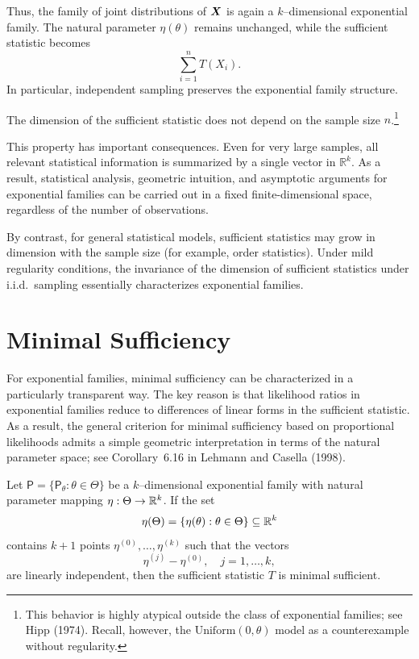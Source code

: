 Thus, the family of joint distributions of \(\boldsymbol{X}\) is again a \(k\)--dimensional exponential family.
The natural parameter \(\eta(\theta)\) remains unchanged, while the sufficient statistic becomes
\[
    \sum\limits_{i=1}^{n} T(X_i).
\]
In particular, independent sampling preserves the exponential family structure.

\begin{note}
The dimension of the sufficient statistic
does not depend on the sample size \(n\).\footnote{This behavior is highly atypical outside the class
of exponential families; see Hipp (1974). Recall, however, the \(\mathrm{Uniform}(0,\theta)\) model
as a counterexample without regularity.}
\end{note}

This property has important consequences. Even for very large samples, all relevant statistical
information is summarized by a single vector in \(\mathbb{R}^k\). As a result, statistical analysis,
geometric intuition, and asymptotic arguments for exponential families can be carried out in a fixed
finite-dimensional space, regardless of the number of observations.

By contrast, for general statistical models, sufficient statistics may grow in dimension with the
sample size (for example, order statistics). Under mild regularity conditions, the invariance of
the dimension of sufficient statistics under i.i.d.\ sampling essentially characterizes exponential
families.

\section{Minimal Sufficiency}
\label{sec:Minimal Sufficiency}

For exponential families, minimal sufficiency can be characterized in a particularly transparent
way. The key reason is that likelihood ratios in exponential families reduce to differences of
linear forms in the sufficient statistic. As a result, the general criterion for minimal sufficiency
based on proportional likelihoods admits a simple geometric interpretation in terms of the natural
parameter space; see Corollary~6.16 in Lehmann and Casella (1998).

\begin{corollary}
    Let \(\mathsf{P}=\{\mathsf{P}_{\theta} : \theta \in \Theta\}\) be a \(k\)--dimensional exponential
    family with natural parameter mapping \(\eta : \Theta \to \mathbb{R}^k\).
    If the set
    \[
        \eta(\Theta) = \{\eta(\theta) : \theta \in \Theta\} \subseteq \mathbb{R}^k
    \]
    contains \(k+1\) points \(\eta^{(0)},\dots,\eta^{(k)}\) such that the vectors
    \[
        \eta^{(j)} - \eta^{(0)}, \quad j=1,\dots,k,
    \]
    are linearly independent, then the sufficient statistic \(T\) is minimal sufficient.
\end{corollary}

